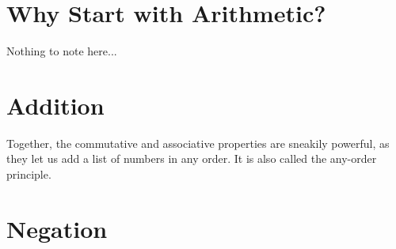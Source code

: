 \documentclass[../master.tex]{subfiles}
\begin{document}
\section{Why Start with Arithmetic?}
Nothing to note here...

\section{Addition}
Together, the commutative and associative properties are sneakily powerful, as they let us add a list of numbers in any order. It is also called the  any-order principle.


\section{Negation}
\end{document}
